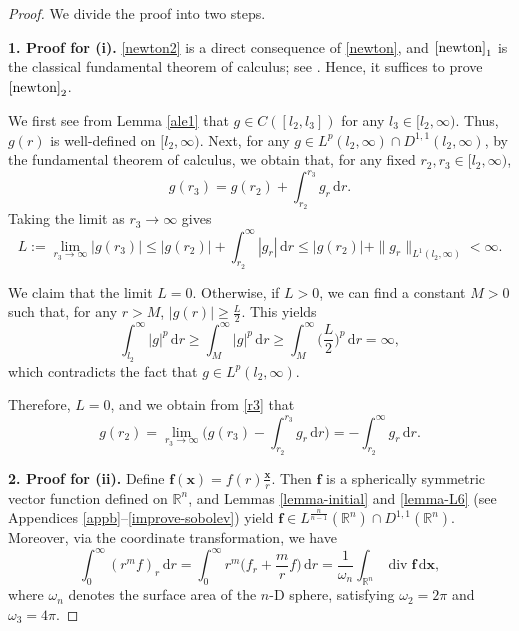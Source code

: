 \documentclass[11pt,reqno]{amsart}
\DeclareMathOperator{\diver}{\mathrm{div}}
\numberwithin{rk}{section}
\numberwithin{prop}{section}
\numberwithin{mydef}{section}
\numberwithin{lem}{section}
\numberwithin{equation}{section}
\numberwithin{thm}{section}
\begin{document}
\begin{proof}
We divide the proof into two steps.

\smallskip
\textbf{1. Proof for (i).} \eqref{newton2} is a direct consequence of \eqref{newton}, and $\eqref{newton}_1$ is the classical fundamental theorem of calculus; see \cite[Chapter 7]{realrudin}. Hence, it suffices to prove $\eqref{newton}_2$. 


We first see from Lemma \ref{ale1} that $g\in C([l_2,l_3])$ for any $l_3\in [l_2,\infty)$. Thus, $g(r)$ is well-defined on $[l_2,\infty)$.  Next, for any $g\in L^p(l_2,\infty)\cap D^{1,1}(l_2,\infty)$, by the fundamental theorem of calculus, we obtain that, for any fixed $r_2,r_3\in [l_2,\infty)$,
\begin{equation}\label{r3}
g(r_3)=g(r_2)+\int_{r_2}^{r_3} g_r\,\mathrm{d}r.
\end{equation}
Taking the limit as $r_3\to \infty$ gives
\begin{equation*} 
L:=\lim_{r_3\to\infty} |g(r_3)|\leq |g(r_2)|+\int_{r_2}^{\infty} |g_r|\,\mathrm{d}r\leq |g(r_2)|+\|g_r\|_{L^1(l_2,\infty)}<\infty.
\end{equation*}

We claim that the limit $L=0$. Otherwise, if $L>0$, we can find a constant $M>0$ such that, for any $r>M$, $|g(r)|\geq \frac{L}{2}$. This yields
\begin{equation*}
\int_{l_2}^\infty |g|^p\,\mathrm{d}r\geq \int_{M}^\infty |g|^p\,\mathrm{d}r\geq \int_{M}^\infty \big(\frac{L}{2}\big)^p\,\mathrm{d}r=\infty,
\end{equation*}
which contradicts the fact that $g\in L^p (l_2,\infty)$.

Therefore, $L=0$, and we obtain from \eqref{r3} that
\begin{equation*} 
g(r_2)=\lim_{r_3\to\infty} \Big(g(r_3)-\int_{r_2}^{r_3} g_r\,\mathrm{d}r\Big)=-\int_{r_2}^{\infty} g_r\,\mathrm{d}r. 
\end{equation*}

 

\smallskip
\textbf{2. Proof for (ii).} Define $\boldsymbol{f}(\boldsymbol{x})=f(r)\frac{\boldsymbol{x}}{r}$. Then $\boldsymbol{f}$ is a spherically symmetric vector function defined on $\mathbb{R}^n$, and Lemmas \ref{lemma-initial} and \ref{lemma-L6} (see Appendices \ref{appb}--\ref{improve-sobolev}) yield $\boldsymbol{f}\in L^\frac{n}{n-1}(\mathbb{R}^n)\cap D^{1,1}(\mathbb{R}^n)$. Moreover, via the coordinate transformation, we have
\begin{equation*}
\int_0^\infty (r^mf)_r\,\mathrm{d}r=\int_0^\infty r^m\big(f_r+\frac{m}{r}f\big)\,\mathrm{d}r=\frac{1}{\omega_n}\int_{\mathbb{R}^n}\diver \boldsymbol{f}\,\mathrm{d}\boldsymbol{x},
\end{equation*}
where $\omega_n$ denotes the surface area of the $n$-D sphere, satisfying $\omega_2=2\pi$ and $\omega_3=4\pi$. 


\end{proof}
\end{document}
